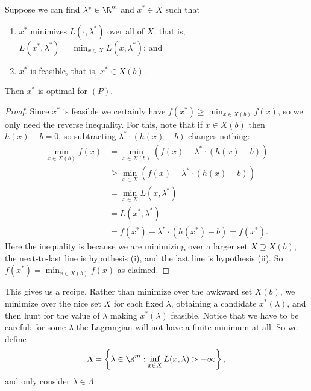 \documentclass[a4paper]{scrartcl}
\begin{document}
\begin{theorem}
    Suppose we can find $\lambda^* \in \R^m$ and $x^* \in X$ such that
    \begin{enumerate}[label=(\roman*)]
        \item $x^*$ minimizes $L(\cdot, \lambda^*)$ over all of $X$, that is, $L(x^*, \lambda^*) = \min_{x \in X} L(x, \lambda^*)$; and
        \item $x^*$ is feasible, that is, $x^* \in X(b)$.
    \end{enumerate}
    Then $x^*$ is optimal for $(P)$.
\end{theorem}
\begin{proof}
    Since $x^*$ is feasible we certainly have $f(x^*) \geq \min_{x \in X(b)}f(x)$, so we only need the reverse inequality. For this, note that if $x \in X(b)$ then $h(x) - b = 0$, so subtracting $\lambda^* \cdot (h(x) - b)$ changes nothing:
    \begin{align*}
        \min_{x \in X(b)}f(x) &= \min_{x \in X(b)}\left(f(x) - \lambda^*\cdot(h(x) - b)\right)\\
        &\geq \min_{x \in X}\left(f(x) - \lambda^*\cdot(h(x) - b)\right) \\
        &= \min_{x \in X}L(x, \lambda^*) \\
        &= L(x^*, \lambda^*) \\
        &= f(x^*) - \lambda^* \cdot (h(x^*) - b) = f(x^*).
    \end{align*}
    Here the inequality is because we are minimizing over a larger set $X \supseteq X(b)$, the next-to-last line is hypothesis (i), and the last line is hypothesis (ii). So $f(x^*) = \min_{x \in X(b)}f(x)$ as claimed.
\end{proof}

This gives us a recipe. Rather than minimize over the awkward set $X(b)$, we minimize over the nice set $X$ for each fixed $\lambda$, obtaining a candidate $x^*(\lambda)$, and then hunt for the value of $\lambda$ making $x^*(\lambda)$ feasible. Notice that we have to be careful: for some $\lambda$ the Lagrangian will not have a finite minimum at all. So we define
$$
\Lambda = \left\{\lambda \in \R^m : \inf_{x \in X}L(x, \lambda) > -\infty\right\},
$$
and only consider $\lambda \in \Lambda$.
\end{document}
